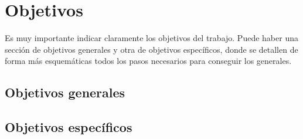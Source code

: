 \chapter{Objetivos}
Es muy importante indicar claramente los objetivos del trabajo. Puede haber una sección de objetivos generales y otra de objetivos específicos, donde se detallen de forma más esquemáticas todos los pasos necesarios para conseguir los generales.
\section{Objetivos generales}
\section{Objetivos específicos}